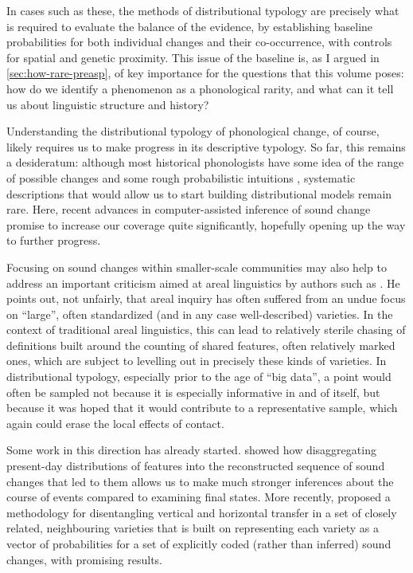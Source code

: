 \documentclass[output=paper,colorlinks,citecolor=brown]{langscibook}
\begin{document}
In cases such as these, the methods of distributional typology are precisely what is required to evaluate the balance of the evidence, by establishing baseline probabilities for both individual changes and their co-occurrence, with controls for spatial and genetic proximity. This issue of the baseline is, as I argued in \cref{sec:how-rare-preasp}, of key importance for the questions that this volume poses: how do we identify a phenomenon as a phonological rarity, and what can it tell us about linguistic structure and history?

Understanding the distributional typology of phonological change, of course, likely requires us to make progress in its descriptive typology. So far, this remains a desideratum: although most historical phonologists have some idea of the range of possible changes and some rough probabilistic intuitions \parencite[cf.][]{Cser_2014}, systematic descriptions that would allow us to start building distributional models \parencite[along the lines of the monumental][]{kummel07:_konson} remain rare. Here, recent advances in computer-assisted inference of sound change \parencite[e.g.][]{list2019automatic,Bodt2019} promise to increase our coverage quite significantly, hopefully opening up the way to further progress.

Focusing on sound changes within smaller\hyp scale communities may also help to address an important criticism aimed at areal linguistics by authors such as \textcite{campbell2006areal}. He points out, not unfairly, that areal inquiry has often suffered from an undue focus on \enquote{large}, often standardized (and in any case well-described) varieties. In the context of traditional areal linguistics, this can lead to relatively sterile chasing of definitions built around the counting of shared features, often relatively marked ones, which are subject to levelling out in precisely these kinds of varieties. In distributional typology, especially prior to the age of \enquote{big data}, a point would often be sampled not because it is especially informative in and of itself, but because it was hoped that it would contribute to a representative sample, which again could erase the local effects of contact.

Some work in this direction has already started. \Textcite{bye2011mapping} showed how disaggregating present-day distributions of features into the reconstructed sequence of sound changes that led to them allows us to make much stronger inferences about the course of events compared to examining final states. More recently, \textcite{cathcart2022dialectal} proposed a methodology for disentangling vertical and horizontal transfer in a set of closely related, neighbouring varieties that is built on representing each variety as a vector of probabilities for a set of explicitly coded (rather than inferred) sound changes, with promising results.
\end{document}
